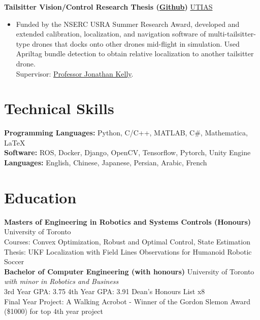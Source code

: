 \documentclass[11pt, a4paper]{cv}
\begin{document}
	\textbf{Tailsitter Vision/Control Research Thesis (\href{https://github.com/utiasSTARS/PhoenixDrone}{Github})} \hfill \href{http://www.starslab.ca}{UTIAS}
	\begin{itemize}
	\item Funded by the NSERC USRA Summer Research Award, developed and extended calibration, localization, and navigation software of multi-tailsitter-type drones that docks onto other drones mid-flight in simulation. Used Apriltag bundle detection to obtain relative localization to another tailsitter drone. \\Supervisor: \href{http://stars.utias.utoronto.ca/~jkelly/}{Professor Jonathan Kelly}.
	\end{itemize}
	
\section*{Technical Skills}
\textbf{Programming Languages:} Python, C/C++, MATLAB, C\#, Mathematica, \LaTeX\\[0.2em]
\textbf{Software:} ROS, Docker, Django, OpenCV, Tensorflow, Pytorch, Unity Engine\\[0.2em]
\textbf{Languages:} English, Chinese, Japanese, Persian, Arabic, French

\section*{Education}
\textbf{Masters of Engineering in Robotics and Systems Controls (Honours)}
\hfill University of Toronto\\
Courses: Convex Optimization, Robust and Optimal Control, State Estimation\\
Thesis: UKF Localization with Field Lines Observations for Humanoid Robotic Soccer\\


\textbf{Bachelor of Computer Engineering (with honours)} \hfill University of Toronto\\
\emph{with minor in Robotics and Business}\\
\small{
	3rd Year GPA: 3.75\hspace{1em}
	4th Year GPA: 3.91\hspace{1em}
	Dean's Honours List x8
}\\
Final Year Project: A Walking Acrobot - Winner of the Gordon Slemon Award (\$1000) for top 4th year project

\end{document}
